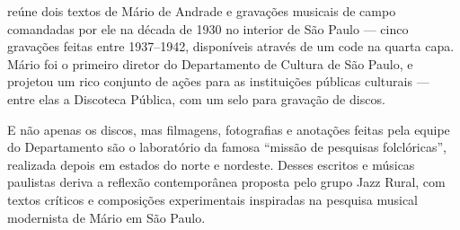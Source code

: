 \hspace*{-7cm}\hrulefill\hspace*{-7cm}

\medskip

 reúne dois textos de Mário de Andrade e gravações musicais de campo comandadas por ele na década de 1930 no interior de São Paulo --- cinco gravações feitas entre 1937--1942, disponíveis através de um  code na quarta capa. Mário foi o primeiro diretor do Departamento de Cultura de São Paulo, e projetou um rico conjunto de ações para as instituições públicas culturais --- entre elas a Discoteca Pública, com um selo para gravação de discos.

E não apenas os discos, mas filmagens, fotografias e anotações feitas pela equipe do Departamento são o laboratório da famosa “missão de pesquisas folclóricas”, realizada depois em estados do norte e nordeste. Desses escritos e músicas paulistas deriva a reflexão contemporânea proposta pelo grupo Jazz Rural, com textos críticos e composições experimentais inspiradas na pesquisa musical modernista de Mário em São Paulo.

\vfill

\hspace*{-.4cm}\begin{minipage}[c]{.5\linewidth}
\small{
{}}
\end{minipage}

\pagebreak

\hspace{.5cm}

